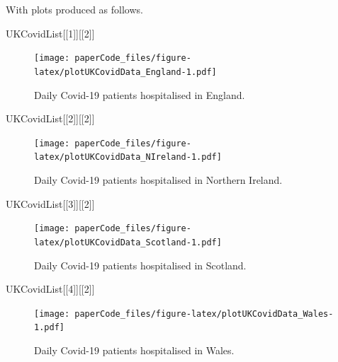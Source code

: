 \documentclass[
]{article}
\newenvironment{Shaded}{\begin{snugshade}}{\end{snugshade}}
\newcommand{\DecValTok}[1]{\textcolor[rgb]{0.00,0.00,0.81}{#1}}
\newcommand{\NormalTok}[1]{#1}
\begin{document}
With plots produced as follows.

\begin{Shaded}
\begin{Highlighting}[]
\NormalTok{UKCovidList[[}\DecValTok{1}\NormalTok{]][[}\DecValTok{2}\NormalTok{]]}
\end{Highlighting}
\end{Shaded}

\begin{figure}
\centering
\texttt{[image: paperCode\_files/figure-latex/plotUKCovidData\_England-1.pdf]}
\caption{\label{fig:UKCovid}Daily Covid-19 patients hospitalised in
England.}
\end{figure}

\begin{Shaded}
\begin{Highlighting}[]
\NormalTok{UKCovidList[[}\DecValTok{2}\NormalTok{]][[}\DecValTok{2}\NormalTok{]]}
\end{Highlighting}
\end{Shaded}

\begin{figure}
\centering
\texttt{[image: paperCode\_files/figure-latex/plotUKCovidData\_NIreland-1.pdf]}
\caption{\label{fig:UKCovid}Daily Covid-19 patients hospitalised in
Northern Ireland.}
\end{figure}

\begin{Shaded}
\begin{Highlighting}[]
\NormalTok{UKCovidList[[}\DecValTok{3}\NormalTok{]][[}\DecValTok{2}\NormalTok{]]}
\end{Highlighting}
\end{Shaded}

\begin{figure}
\centering
\texttt{[image: paperCode\_files/figure-latex/plotUKCovidData\_Scotland-1.pdf]}
\caption{\label{fig:UKCovid}Daily Covid-19 patients hospitalised in
Scotland.}
\end{figure}

\begin{Shaded}
\begin{Highlighting}[]
\NormalTok{UKCovidList[[}\DecValTok{4}\NormalTok{]][[}\DecValTok{2}\NormalTok{]]}
\end{Highlighting}
\end{Shaded}

\begin{figure}
\centering
\texttt{[image: paperCode\_files/figure-latex/plotUKCovidData\_Wales-1.pdf]}
\caption{\label{fig:UKCovid}Daily Covid-19 patients hospitalised in
Wales.}
\end{figure}
\end{document}
